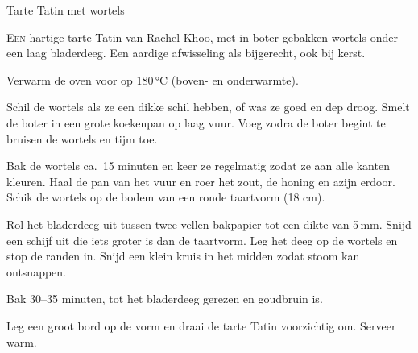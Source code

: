 \begin{recipe}{Tarte Tatin met wortels}


\lettrine{E}{en} hartige tarte Tatin van Rachel Khoo\cite{khoo-tartetatin}, met
in boter gebakken wortels onder een laag bladerdeeg. Een aardige afwisseling
als bijgerecht, ook bij kerst.

\begin{ingredients}
\end{ingredients}

\begin{steps}
  \item Verwarm de oven voor op 180\,°C (boven- en onderwarmte).
  \item Schil de wortels als ze een dikke schil hebben, of was ze goed en dep droog.
        Smelt de boter in een grote koekenpan op laag vuur. Voeg zodra de boter
        begint te bruisen de wortels en tijm toe.
  \item Bak de wortels ca.\ 15 minuten en keer ze regelmatig zodat ze aan alle
        kanten kleuren. Haal de pan van het vuur en roer het zout, de honing en
        azijn erdoor. Schik de wortels op de bodem van een ronde taartvorm (18 cm).
  \item Rol het bladerdeeg uit tussen twee vellen bakpapier tot een dikte van
        5\,mm. Snijd een schijf uit die iets groter is dan de taartvorm. Leg het
        deeg op de wortels en stop de randen in. Snijd een klein kruis in het midden
        zodat stoom kan ontsnappen.
  \item Bak 30--35 minuten, tot het bladerdeeg gerezen en goudbruin is.
  \item Leg een groot bord op de vorm en draai de tarte Tatin voorzichtig om.
        Serveer warm.
\end{steps}
\end{recipe}
